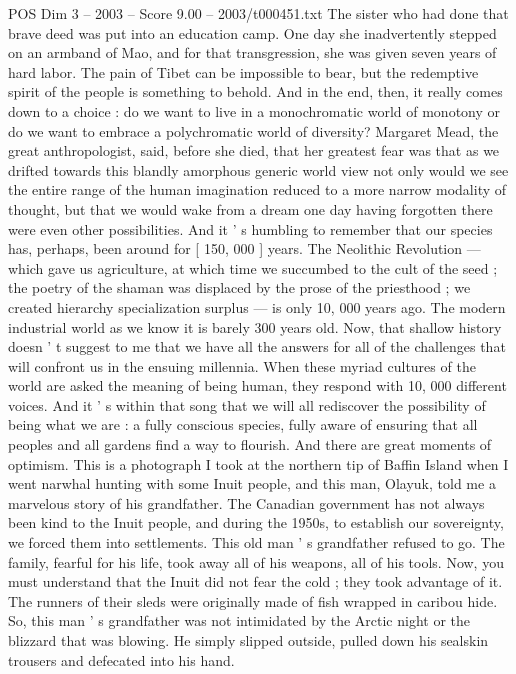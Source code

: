\begin{textsample}{POS Dim 3 – 2003 – Score 9.00 – 2003/t000451.txt}
The sister who had done that brave deed was put into an education camp.
One day she inadvertently stepped on an armband of Mao, and for that transgression, she was given seven years of hard labor.
The pain of Tibet can be impossible to bear, but the redemptive spirit of the people is something to behold.
And in the end, then, it really comes down to a choice : do we want to live in a monochromatic world of monotony or do we want to embrace a polychromatic world of diversity?
Margaret Mead, the great anthropologist, said, before she died, that her greatest fear was that as we drifted towards this blandly amorphous generic world view not only would we see the entire range of the human imagination reduced to a more narrow modality of thought, but that we would wake from a dream one day having forgotten there were even other possibilities.
And it ' s humbling to remember that our species has, perhaps, been around for [ 150, 000 ] years.
The Neolithic Revolution — which gave us agriculture, at which time we succumbed to the cult of the seed ; the poetry of the shaman was displaced by the prose of the priesthood ; we created hierarchy specialization surplus — is only 10, 000 years ago.
The modern industrial world as we know it is barely 300 years old.
Now, that shallow history doesn ' t suggest to me that we have all the answers for all of the challenges that will confront us in the ensuing millennia.
When these myriad cultures of the world are asked the meaning of being human, they respond with 10, 000 different voices.
And it ' s within that song that we will all rediscover the possibility of being what we are : a fully conscious species, fully aware of ensuring that all peoples and all gardens find a way to flourish.
And there are great moments of optimism.
This is a photograph I took at the northern tip of Baffin Island when I went narwhal hunting with some Inuit people, and this man, Olayuk, told me a marvelous story of his grandfather.
The Canadian government has not always been kind to the Inuit people, and during the 1950s, to establish our sovereignty, we forced them into settlements.
This old man ' s grandfather refused to go.
The family, fearful for his life, took away all of his weapons, all of his tools.
Now, you must understand that the Inuit did not fear the cold ; they took advantage of it.
The runners of their sleds were originally made of fish wrapped in caribou hide.
So, this man ' s grandfather was not intimidated by the Arctic night or the blizzard that was blowing.
He simply slipped outside, pulled down his sealskin trousers and defecated into his hand.

\end{textsample}
